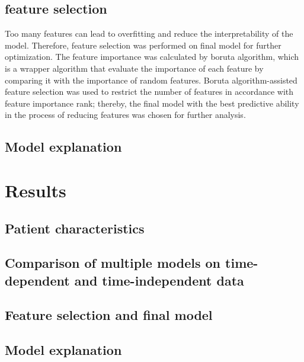 \documentclass[preprint,12pt,authoryear]{elsarticle}
\begin{document}
\subsection{feature selection}\label{FeatureSelection}

Too many features can lead to overfitting and reduce the interpretability of the model. Therefore, feature selection was performed on final model for further optimization. The feature importance was calculated by boruta algorithm, which is a wrapper algorithm that evaluate the importance of each feature by comparing it with the importance of random features. Boruta algorithm-assisted feature selection was used to restrict the number of features in accordance with feature importance rank; thereby, the final model with the best predictive ability in the process of reducing features was chosen for further analysis. 


\subsection{Model explanation}\label{ModelExplanationMethods}




\section{Results}\label{Results}

\subsection{Patient characteristics}\label{PatientCharacteristics}



\subsection{Comparison of multiple models on time-dependent and time-independent data}\label{ModelComparison}




\subsection{Feature selection and final model}\label{FinalModel}




\subsection{Model explanation}\label{ModelExplanationResults}
\end{document}
